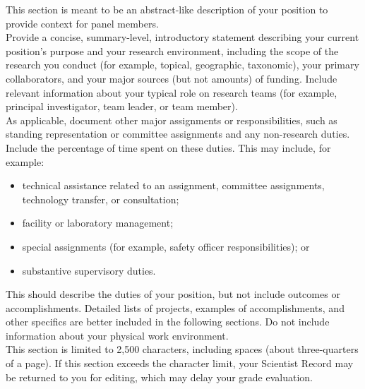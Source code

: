This section is meant to be an abstract-like description of your position to provide context for panel members. \\

Provide a concise, summary-level, introductory statement describing your current position’s purpose and your research environment, including the scope of the research you conduct (for example, topical, geographic, taxonomic), your primary collaborators, and your major sources (but not amounts) of funding.
Include relevant information about your typical role on research teams (for example, principal investigator, team leader, or team member).\\

As applicable, document other major assignments or responsibilities, such as standing representation or committee assignments and any non-research duties. 
Include the percentage of time spent on these duties.
This may include, for example: 

\begin{itemize}
\item technical assistance related to an assignment, committee assignments, technology transfer, or consultation;
\item facility or laboratory management;
\item special assignments (for example, safety officer responsibilities); or
\item substantive supervisory duties.
\end{itemize}

This should describe the duties of your position, but not include outcomes or accomplishments.
Detailed lists of projects, examples of accomplishments, and other specifics are better included in the following sections.
Do not include information about your physical work environment. \\

This section is limited to 2,500 characters, including spaces (about three-quarters of a page).
If this section exceeds the character limit, your Scientist Record may be returned to you for editing, which may delay your grade evaluation.

